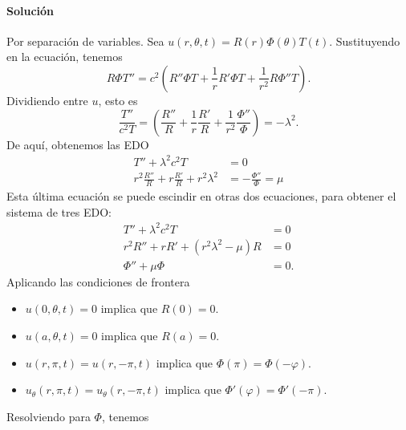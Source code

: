 \documentclass[11pt,letterpaper]{report}
\newcommand\<{\langle}
\renewcommand\>{\rangle}
\renewcommand\phi\varphi
\begin{document}
\paragraph{Solución}
Por separación de variables.
Sea $u(r,\theta,t)=R(r)\Phi(\theta)T(t)$.
Sustituyendo en la ecuación, tenemos
\[
  R\Phi T''
  = c^{2}
  \left(R''\Phi T
  +\frac{1}{r}R'\Phi T
  +\frac{1}{r^{2}}R\Phi''T\right)
.\]
Dividiendo entre $u$, esto es
\[
  \frac{T''}{c^{2}T}
  =
  \left(
    \frac{R''}{R}
    +\frac{1}{r}\frac{R'}{R}
    +\frac{1}{r^{2}}\frac{\Phi''}{\Phi}
  \right)
  =-\lambda^{2}
.\]
De aquí, obtenemos las EDO
\begin{align*}
  T''+\lambda^{2}c^{2}T &= 0 \\
  r^{2}\frac{R''}{R}
  +r\frac{R'}{R}
  +r^{2}\lambda^{2}
  &=
  -\frac{\Phi''}{\Phi}
  = \mu
\end{align*}
Esta última ecuación se puede escindir en otras dos ecuaciones, para
obtener el sistema de tres EDO:
\begin{align*}
  T''+\lambda^{2}c^{2}T &= 0 \\
  r^{2}R'' +rR' +(r^{2}\lambda^{2}-\mu)R &= 0 \\
  \Phi'' +\mu\Phi &= 0.
\end{align*}
Aplicando las condiciones de frontera
\begin{itemize}
  \item
    $u(0,\theta,t)=0$ implica que $R(0)=0$.
  \item
    $u(a,\theta,t)=0$ implica que $R(a)=0$.
  \item
    $u(r,\pi,t)=u(r,-\pi,t)$ implica que $\Phi(\pi)=\Phi(-\phi)$.
  \item
    $u_\theta(r,\pi,t)=u_\theta(r,-\pi,t)$ implica que
    $\Phi'(\phi)=\Phi'(-\pi)$.
\end{itemize}
Resolviendo para $\Phi$, tenemos
\end{document}
